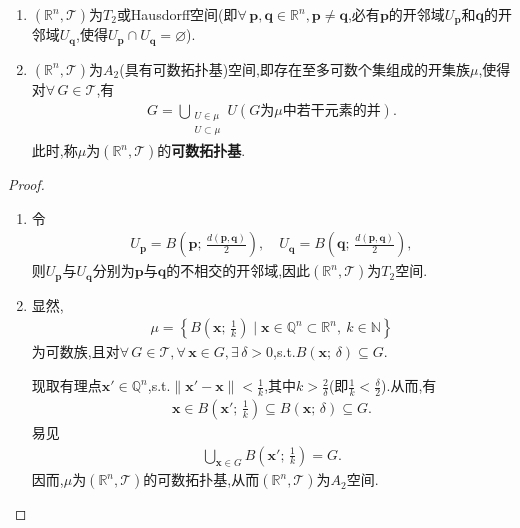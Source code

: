 \documentclass[../../main.tex]{subfiles}%
\begin{document}
\begin{lemma}\label{lemma:实变函数--引理1.4.6}
\begin{enumerate}[(1)]
\item\label{lemma:实变函数--引理1.4.6-1} $(\mathbb{R}^n,\mathcal{T})$为$T_2$或Hausdorff空间(即$\forall\,\boldsymbol{p},\boldsymbol{q}\in\mathbb{R}^n,\boldsymbol{p}\neq\boldsymbol{q}$,必有$\boldsymbol{p}$的开邻域$U_{\boldsymbol{p}}$和$\boldsymbol{q}$的开邻域$U_{\boldsymbol{q}}$,使得$U_{\boldsymbol{p}}\cap U_{\boldsymbol{q}}=\varnothing$).

\item\label{lemma:实变函数--引理1.4.6-2} $(\mathbb{R}^n,\mathcal{T})$为$A_2$(具有可数拓扑基)空间,即存在至多可数个集组成的开集族$\mu$,使得对$\forall\,G\in\mathcal{T}$,有
\begin{align*}
G=\bigcup_{\substack{U\in\mu\\U\subset\mu}}U(G\text{为}\mu\text{中若干元素的并}).
\end{align*}
此时,称$\mu$为$(\mathbb{R}^n,\mathcal{T})$的\textbf{可数拓扑基}.
\end{enumerate}
\end{lemma}
\begin{proof}
\begin{enumerate}[(1)]
\item 令
\begin{align*}
U_{\boldsymbol{p}}=B\left(\boldsymbol{p};\,\frac{d(\boldsymbol{p},\boldsymbol{q})}{2}\right),\quad U_{\boldsymbol{q}}=B\left(\boldsymbol{q};\,\frac{d(\boldsymbol{p},\boldsymbol{q})}{2}\right),
\end{align*}
则$U_{\boldsymbol{p}}$与$U_{\boldsymbol{q}}$分别为$\boldsymbol{p}$与$\boldsymbol{q}$的不相交的开邻域,因此$(\mathbb{R}^n,\mathcal{T})$为$T_2$空间.

\item 显然,
\begin{align*}
\mu=\left\{B\left(\boldsymbol{x};\,\frac{1}{k}\right)\mid \boldsymbol{x}\in\mathbb{Q}^n\subset\mathbb{R}^n,\ k\in\mathbb{N}\right\}
\end{align*}
为可数族,且对$\forall\,G\in\mathcal{T},\forall\,\boldsymbol{x}\in G,\exists\,\delta>0$,s.t.$B(\boldsymbol{x};\,\delta)\subseteq G$.

现取有理点$\boldsymbol{x}'\in\mathbb{Q}^n$,s.t.$\|\boldsymbol{x}'-\boldsymbol{x}\|<\frac{1}{k}$,其中$k>\frac{2}{\delta}$(即$\frac{1}{k}<\frac{\delta}{2}$).从而,有
\begin{align*}
\boldsymbol{x}\in B\left(\boldsymbol{x}';\,\frac{1}{k}\right)\subseteq B(\boldsymbol{x};\,\delta)\subseteq G.
\end{align*}
易见
\begin{align*}
\bigcup_{\boldsymbol{x}\in G}B\left(\boldsymbol{x}';\,\frac{1}{k}\right)=G.
\end{align*}
因而,$\mu$为$(\mathbb{R}^n,\mathcal{T})$的可数拓扑基,从而$(\mathbb{R}^n,\mathcal{T})$为$A_2$空间.
\end{enumerate}

\end{proof}
\end{document}
